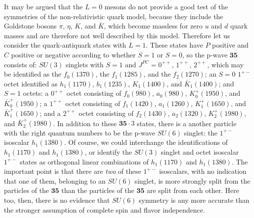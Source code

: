It may be argued that the $L=0$ mesons do not provide a good test of the
symmetries of the non-relativistic quark model, because they include the
Goldstone bosons $\pi$, $\eta$, $K$, and $\bar K$, which become massless for
zero $u$ and $d$ quark masses and are therefore not well described by this
model. Therefore let us consider the quark-antiquark states with $L=1$. These
states have $P$ positive and $C$ positive or negative according to whether $S=1$
or $S=0$, so the p-wave $\mathbf{35}$ consists of: $SU(3)$ singlets with $S=1$
and $J^{PC}=0^{++}$, $1^{++}$, $2^{++}$, which may be identified as the
$f_0(1370)$, the $f_1(1285)$, and the $f_2(1270)$; an $S=0$ $1^{+-}$ octet
identified as $h_1(1170)$, $b_1(1235)$, $K_1(1400)$, and $\bar K_1(1400)$; and
$S=1$ octets: a $0^{++}$ octet consisting of $f_0(980)$, $a_0(980)$,
$K_0^+(1950)$, and $\bar K_0^+(1950)$; a $1^{++}$ octet consisting of
$f_1(1420)$, $a_1(1260)$, $K_1^+(1650)$, and $\bar K_1^+(1650)$; and a
$2^{++}$ octet consisting of $f_2(1430)$, $a_2(1320)$, $K_2^+(1980)$, and
$\bar K_2^+(1980)$. In addition to these $\mathbf{35}\cdot3$ states, there is
a another particle with the right quantum numbers to be the p-wave $SU(6)$
singlet: the $1^{+-}$ isoscalar $h_1(1380)$. Of course, we could interchange
the identifications of $h_1(1170)$ and $h_1(1380)$, or identify the $SU(3)$
singlet and octet isoscalar $1^{+-}$ states as orthogonal linear combinations
of $h_1(1170)$ and $h_1(1380)$. The important point is that there are
\emph{two} of these $1^{+-}$ isoscalars, with no indication that one of them,
belonging to an $SU(6)$ singlet, is more strongly split from the particles of
the $\mathbf{35}$ than the particles of the $\mathbf{35}$ are split from each
other. Here too, then, there is no evidence that $SU(6)$ symmetry is any more
accurate than the stronger assumption of complete spin and flavor independence.
